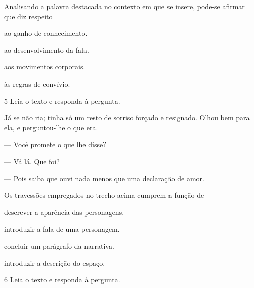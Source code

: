 Analisando a palavra destacada no contexto em que se insere, 
pode-se afirmar que diz respeito

\begin{escolha}
\item ao ganho de conhecimento.

\item ao desenvolvimento da fala.

\item aos movimentos corporais.

\item às regras de convívio.
\end{escolha}

\num{5} Leia o texto e responda à pergunta.

\begin{myquote}
\textit{ }

Já se não ria; tinha só um resto de sorriso forçado e resignado. Olhou
bem para ela, e perguntou-lhe o que era.

--- Você promete o que lhe disse?

--- Vá lá. Que foi?

--- Pois saiba que ouvi nada menos que uma declaração de amor.

\end{myquote}

Os travessões empregados no trecho acima cumprem a função de

\begin{escolha}
  \item descrever a aparência das personagens.

  \item introduzir a fala de uma personagem.

  \item concluir um parágrafo da narrativa.

  \item introduzir a descrição do espaço.
\end{escolha}

\pagebreak
\num{6} Leia o texto e responda à pergunta.

